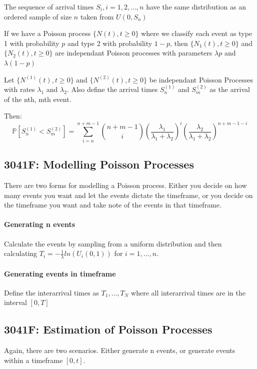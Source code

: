 \documentclass[12pt]{article}
\begin{document}
The sequence of arrival times \({S_i, i=1, 2, \dots, n}\) have the same distribution as an ordered sample of size \(n\) taken from \(U(0, S_n)\)


If we have a Poisson process \(\{N(t), t \ge 0\}\) where we classify each event as type 1
with probability \(p\) and type 2 with probability \(1-p\), then 
\(\{N_1(t), t \ge 0\}\) and \(\{N_2(t), t \ge 0\}\) are independant Poisson 
processes with parameters \(\lambda p\) and \(\lambda (1-p)\)


Let \(\{N^{(1)}(t), t \ge 0\}\) and \(\{N^{(2)}(t), t \ge 0\}\) be independant Poisson 
Processes with rates \(\lambda_1\) and \(\lambda_2\).
Also define the arrival times \(S^{(1)}_n\) and \(S^{(2)}_m\) as the arrival of the nth, mth event.

Then:
\begin{equation*}
    \mathbb{P}[S^{(1)}_n < S^{(2)}_m] = 
    \sum_{i=n}^{n + m - 1} 
    \binom{n + m - 1}{i} 
    \left( \frac{\lambda_1}{\lambda_1 + \lambda_2} \right)^i 
    \left( \frac{\lambda_2}{\lambda_1 + \lambda_2} \right)^{n + m - 1 - i}
\end{equation*}
\subsection{3041F: Modelling Poisson Processes}
There are two forms for modelling a Poisson process. 
Either you decide on how many events you want and let the events dictate the timeframe,
or you decide on the timeframe you want and take note of the events in that timeframe.

\paragraph{Generating n events} Calculate the events by sampling from a uniform distribution and then calculating \(T_i = -\frac{1}{\lambda} ln(U_i(0,  1))\) for \(i = 1, \dots, n\). 
\paragraph{Generating events in timeframe} Define the interarrival times as \(T_1, \dots, 
T_N\) where all interarrival times are in the interval \([0, T]\)
\subsection{3041F: Estimation of Poisson Processes}
Again, there are two scenarios. Either generate n events, or generate events within a timeframe \([0, t]\).
\end{document}
